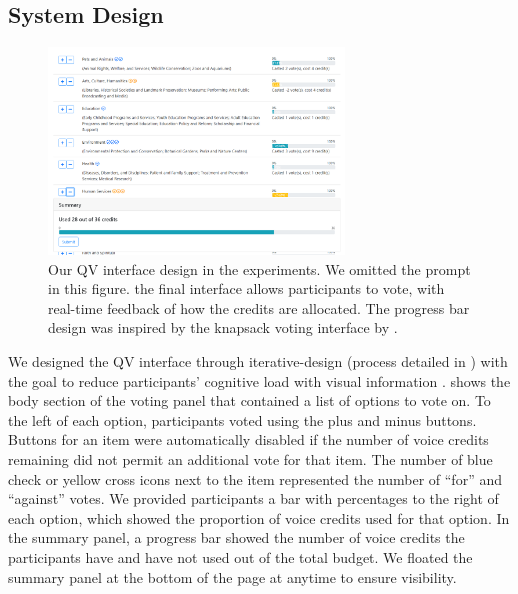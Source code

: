 

\subsection{System Design}

\begin{figure}[htpb]
    \centering
    \includegraphics[width=0.7\textwidth, keepaspectratio=true]{content/image/qv-donation.png}
    \caption{
        Our QV interface design in the experiments. 
        We omitted the prompt in this figure.
        the final interface allows participants to vote, with real-time feedback of how the credits are allocated. 
        The progress bar design was inspired by the knapsack voting interface by \cite{goel2015knapsack}.
    }
    \label{fig:qv_donation}
\end{figure}

We designed the QV interface through iterative-design (process detailed in ) with the goal to reduce participants' cognitive load with visual information \cite{oviatt2006human}.  shows the body section of the voting panel that contained a list of options to vote on. To the left of each option, participants voted using the plus and minus buttons. Buttons for an item were automatically disabled if the number of voice credits remaining did not permit an additional vote for that item. The number of blue check or yellow cross icons next to the item represented the number of ``for'' and ``against'' votes. We provided participants a bar with percentages to the right of each option, which showed the proportion of voice credits used for that option.  In the summary panel, a progress bar showed the number of voice credits the participants have and have not used out of the total budget. We floated the summary panel at the bottom of the page at anytime to ensure visibility.

